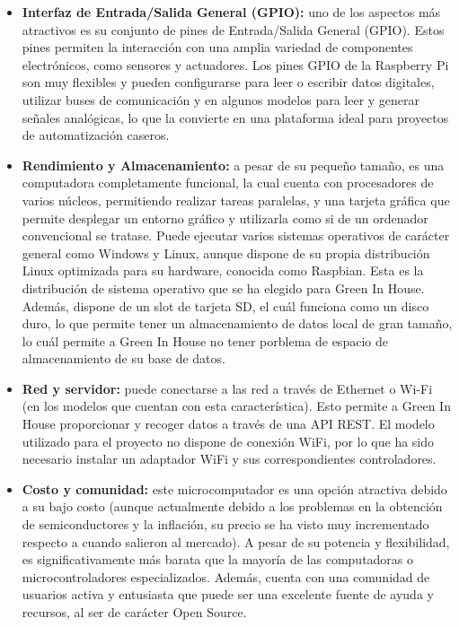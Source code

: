 \begin{itemize}
    \item \textbf{Interfaz de Entrada/Salida General (GPIO):} uno de los aspectos más atractivos es su conjunto de pines de Entrada/Salida General (GPIO). Estos pines permiten la interacción con una amplia variedad de componentes electrónicos, como sensores y actuadores. Los pines GPIO de la Raspberry Pi son muy flexibles y pueden configurarse para leer o escribir datos digitales, utilizar buses de comunicación y en algunos modelos para leer y generar señales analógicas, lo que la convierte en una plataforma ideal para proyectos de automatización caseros.
    \item \textbf{Rendimiento y Almacenamiento:} a pesar de su pequeño tamaño, es una computadora completamente funcional, la cual cuenta con procesadores de varios núcleos, permitiendo realizar tareas paralelas, y una tarjeta gráfica que permite desplegar un entorno gráfico y utilizarla como si de un ordenador convencional se tratase. Puede ejecutar varios sistemas operativos de carácter general como Windows y Linux, aunque dispone de su propia distribución Linux optimizada para su hardware, conocida como Raspbian. Esta es la distribución de sistema operativo que se ha elegido para Green In House. Además, dispone de un slot de tarjeta SD, el cuál funciona como un disco duro, lo que permite tener un almacenamiento de datos local de gran tamaño, lo cuál permite a Green In House no tener porblema de espacio de almacenamiento de su base de datos.
    \item \textbf{Red y servidor:} puede conectarse a las red a través de Ethernet o Wi-Fi (en los modelos que cuentan con esta característica). Esto permite a Green In House proporcionar y recoger datos a través de una API REST. El modelo utilizado para el proyecto no dispone de conexión WiFi, por lo que ha sido necesario instalar un adaptador WiFi y sus correspondientes controladores.
    \item \textbf{Costo y comunidad:} este microcomputador es una opción atractiva debido a su bajo costo (aunque actualmente debido a los problemas en la obtención de semiconductores y la inflación, su precio se ha visto muy incrementado respecto a cuando salieron al mercado). A pesar de su potencia y flexibilidad, es significativamente más barata que la mayoría de las computadoras o microcontroladores especializados. Además, cuenta con una comunidad de usuarios activa y entusiasta que puede ser una excelente fuente de ayuda y recursos, al ser de carácter Open Source.
\end{itemize}


